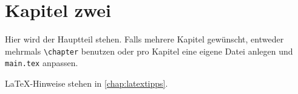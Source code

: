
\chapter{Kapitel zwei}
\label{chap:k2}

Hier wird der Hauptteil stehen. Falls mehrere Kapitel gewünscht, entweder mehrmals \texttt{\textbackslash{}chapter} benutzen oder pro Kapitel eine eigene Datei anlegen und \texttt{main.tex} anpassen.

LaTeX-Hinweise stehen in \cref{chap:latextipps}.

\blinddocument
